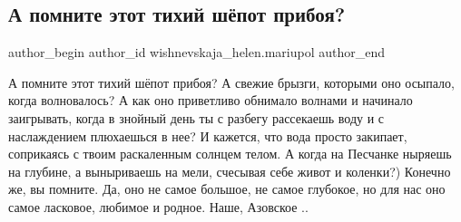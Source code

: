  
 
 
 
 

\subsection{А помните этот тихий шёпот прибоя?}
\label{sec:29_12_2022.fb.wishnevskaja_helen.mariupol.1.a_pomnite_etot_tikhi}

\ifcmt
 author_begin
   author_id wishnevskaja_helen.mariupol
 author_end
\fi

А помните этот тихий шёпот прибоя? А свежие брызги, которыми оно осыпало, когда
волновалось? А как оно приветливо обнимало волнами и начинало заигрывать, когда
в знойный день ты с разбегу  рассекаешь воду и с наслаждением плюхаешься в нее?
И кажется,  что вода просто закипает, соприкаясь с твоим раскаленным  солнцем
телом.  А когда на Песчанке ныряешь на глубине,  а выныриваешь на мели,
счесывая себе живот и коленки?) Конечно же, вы помните. Да, оно не самое
большое,  не самое глубокое,  но для нас оно самое ласковое, любимое и родное.
Наше, Азовское ..
